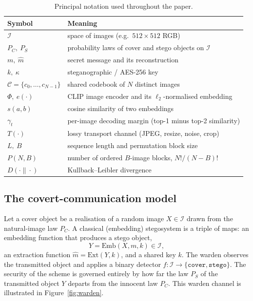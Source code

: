 \documentclass[11pt]{article}
\theoremstyle{definition}
\newcommand{\Fig}[1]{Figure~\ref{#1}}
\begin{document}
\begin{table}[H]
\centering
\caption{Principal notation used throughout the paper.}\label{tab:notation}
\begin{tabular}{@{}ll@{}}
\toprule
Symbol & Meaning \\
\midrule
$\mathcal{I}$ & space of images (e.g.\ $512{\times}512$ RGB) \\
$P_C,\ P_S$ & probability laws of cover and stego objects on $\mathcal{I}$ \\
$m,\ \hat m$ & secret message and its reconstruction \\
$k,\ \kappa$ & steganographic / AES-256 key \\
$\mathcal{C}=\{c_0,\dots,c_{N-1}\}$ & shared codebook of $N$ distinct images \\
$\Phi,\ e(\cdot)$ & CLIP image encoder and its $\ell_2$-normalised embedding \\
$s(a,b)$ & cosine similarity of two embeddings \\
$\gamma_t$ & per-image decoding margin (top-1 minus top-2 similarity) \\
$T(\cdot)$ & lossy transport channel (JPEG, resize, noise, crop) \\
$L,\ B$ & sequence length and permutation block size \\
$P(N,B)$ & number of ordered $B$-image blocks, $N!/(N-B)!$ \\
$D(\cdot\|\cdot)$ & Kullback--Leibler divergence \\
\bottomrule
\end{tabular}
\end{table}

\subsection{The covert-communication model}\label{sec:model}
Let a cover object be a realisation of a random image $X\in\mathcal{I}$ drawn from
the natural-image law $P_C$. A classical (embedding) stegosystem is a triple of
maps: an embedding function that produces a stego object,
\begin{equation}
  Y=\mathrm{Emb}(X,m,k)\in\mathcal{I},
  \label{eq:emb}
\end{equation}
an extraction function $\hat m=\mathrm{Ext}(Y,k)$, and a shared key $k$. The warden
observes the transmitted object and applies a binary detector
$f:\mathcal{I}\to\{\texttt{cover},\texttt{stego}\}$. The security of the scheme is
governed entirely by how far the law $P_S$ of the transmitted object $Y$ departs
from the innocent law $P_C$. This warden channel is illustrated in
\Fig{fig:warden}.
\end{document}

